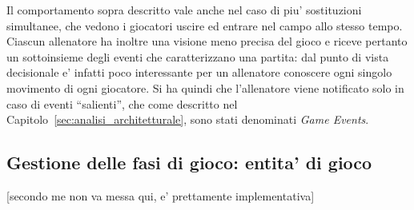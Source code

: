 Il comportamento sopra descritto vale anche nel caso di piu' sostituzioni simultanee, che vedono i giocatori uscire ed entrare nel campo allo stesso tempo.\\

Ciascun allenatore ha inoltre una visione meno precisa del gioco e riceve pertanto un sottoinsieme degli eventi che caratterizzano una partita: dal punto di vista decisionale e' infatti poco interessante per un allenatore conoscere ogni singolo movimento di ogni giocatore. Si ha quindi che l'allenatore viene notificato solo in caso di eventi ``salienti'', che come descritto nel Capitolo~\ref{sec:analisi_architetturale}, sono stati denominati \textit{Game Events}.

\subsection*{Gestione delle fasi di gioco: entita' di gioco}
%
\label{sec:modello_fasi_game_entity}


[secondo me non va messa qui, e' prettamente implementativa]
